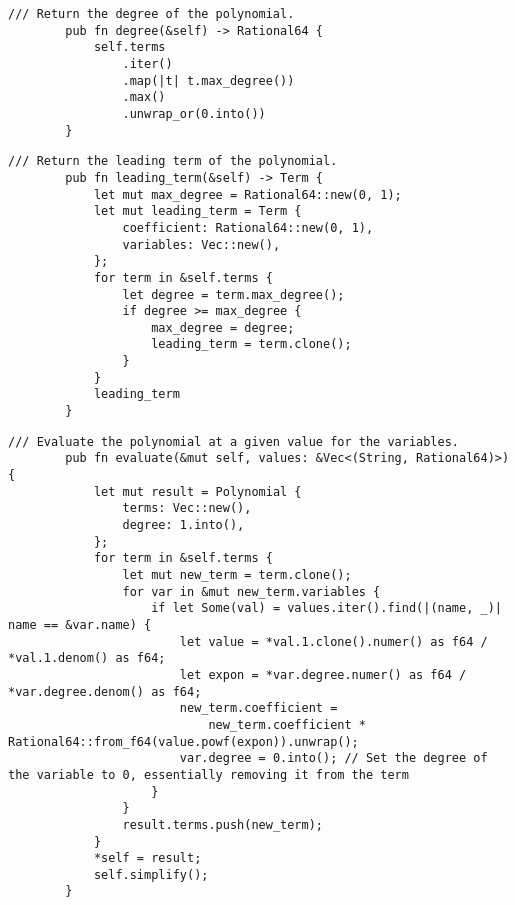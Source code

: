     \begin{lstlisting}[caption={The implementation of the \texttt{degree()} method for the \texttt{Polynomial} struct}, label={lst:polynomial-degree}]
        /// Return the degree of the polynomial.
        pub fn degree(&self) -> Rational64 {
            self.terms
                .iter()
                .map(|t| t.max_degree())
                .max()
                .unwrap_or(0.into())
        }
    \end{lstlisting}

    \begin{lstlisting}[caption={The implementation of the \texttt{leading\_term()} method for the \texttt{Polynomial} struct}, label={lst:polynomial-leading-term}]
        /// Return the leading term of the polynomial.
        pub fn leading_term(&self) -> Term {
            let mut max_degree = Rational64::new(0, 1);
            let mut leading_term = Term {
                coefficient: Rational64::new(0, 1),
                variables: Vec::new(),
            };
            for term in &self.terms {
                let degree = term.max_degree();
                if degree >= max_degree {
                    max_degree = degree;
                    leading_term = term.clone();
                }
            }
            leading_term
        }
    \end{lstlisting}

    \begin{lstlisting}[caption={The implementation of the \texttt{evaluate()} method for the \texttt{Polynomial} struct}, label={lst:polynomial-evaluate}]
        /// Evaluate the polynomial at a given value for the variables.
        pub fn evaluate(&mut self, values: &Vec<(String, Rational64)>) {
            let mut result = Polynomial {
                terms: Vec::new(),
                degree: 1.into(),
            };
            for term in &self.terms {
                let mut new_term = term.clone();
                for var in &mut new_term.variables {
                    if let Some(val) = values.iter().find(|(name, _)| name == &var.name) {
                        let value = *val.1.clone().numer() as f64 / *val.1.denom() as f64;
                        let expon = *var.degree.numer() as f64 / *var.degree.denom() as f64;
                        new_term.coefficient =
                            new_term.coefficient * Rational64::from_f64(value.powf(expon)).unwrap();
                        var.degree = 0.into(); // Set the degree of the variable to 0, essentially removing it from the term
                    }
                }
                result.terms.push(new_term);
            }
            *self = result;
            self.simplify();
        }
    \end{lstlisting}

